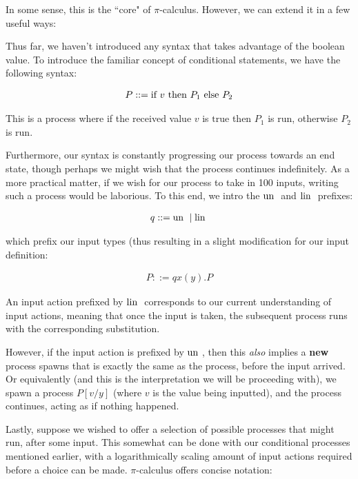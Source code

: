 In some sense, this is the ``core" of $\pi$-calculus. However, we can extend it in a few useful ways:

Thus far, we haven't introduced any syntax that takes advantage of the boolean value. To introduce the familiar concept of conditional statements, we have the following syntax:

\begin{align*}
    P ::= \text{if } v \text{ then } P_1 \text{ else } P_2
\end{align*}

This is a process where if the received value $v$ is $\text{true}$ then $P_1$ is run, otherwise $P_2$ is run.

Furthermore, our syntax is constantly progressing our process towards an end state, though perhaps we might wish that the process continues indefinitely. As a more practical matter, if we wish for our process to take in 100 inputs, writing such a process would be laborious. To this end, we intro the $\text{un }$ and $\text{lin }$ prefixes:

\begin{align*}
    q ::= \text{un } \mid \text{lin }
\end{align*}

which prefix our input types (thus resulting in a slight modification for our input definition:

\begin{align*}
    P ::= q x(y).P
\end{align*}

An input action prefixed by $\text{lin }$ corresponds to our current understanding of input actions, meaning that once the input is taken, the subsequent process runs with the corresponding substitution.

However, if the input action is prefixed by $\text{un }$, then this \textit{also} implies a \textbf{new} process spawns that is exactly the same as the process, before the input arrived. Or equivalently (and this is the interpretation we will be proceeding with), we spawn a process $P[v/y]$ (where $v$ is the value being inputted), and the process continues, acting as if nothing happened.

Lastly, suppose we wished to offer a selection of possible processes that might run, after some input. This somewhat can be done with our conditional processes mentioned earlier, with a logarithmically scaling amount of input actions required before a choice can be made. $\pi$-calculus offers concise notation:

